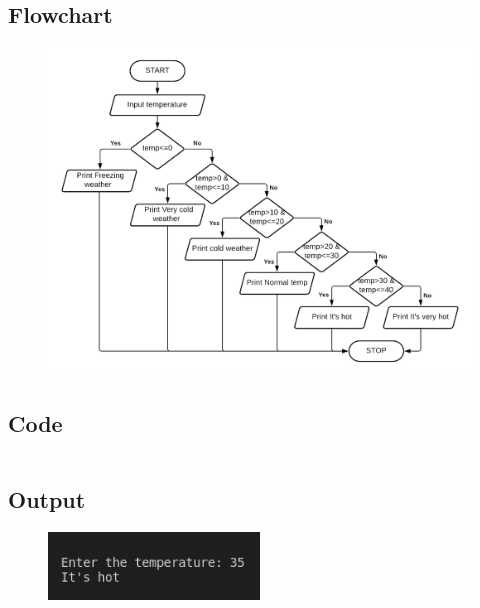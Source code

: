 \documentclass[12pt]{article}
\begin{document}
\subsection{Flowchart}
\begin{figure}[h]
    \centering
    \includegraphics[width=1.1\textwidth]{Flowchart06.png}
\end{figure}
\newpage
\subsection{Code}
\inputminted{c}{q6.c}
\subsection{Output}
\begin{figure}[h]
    \centering
    \includegraphics[width=0.5\textwidth]{6.png}
\end{figure}
\newpage
\section{}
\end{document}
